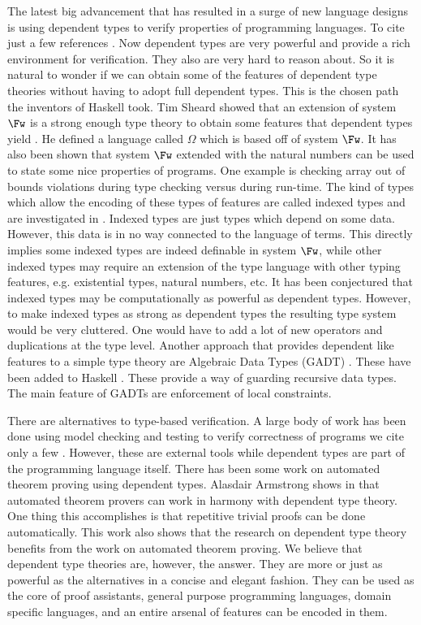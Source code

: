 The latest big advancement that has resulted in a surge of new
language designs is using dependent types to verify properties of
programming languages.  To cite just a few references
\cite{Vytiniotis:2007,Brady:2011,Mcbride:2004,Altenkirch:2003,Norell:2007,Stump:2009,Licata:2005}.
Now dependent types are very powerful and provide a rich environment
for verification.  They also are very hard to reason about.  So it is
natural to wonder if we can obtain some of the features of dependent
type theories without having to adopt full dependent types.  This is
the chosen path the inventors of Haskell took.  Tim Sheard showed that
an extension of system $\Fw$ is a strong enough type theory to obtain
some features that dependent types yield \cite{Sheard:2006}.  He
defined a language called $\Omega$ which is based off of system $\Fw$.
It has also been shown that system $\Fw$ extended with the natural
numbers can be used to state some nice properties of programs.  One
example is checking array out of bounds violations during type
checking versus during run-time.  The kind of types which allow the
encoding of these types of features are called indexed types and are
investigated in \cite{Fogarty:2007,Zenger:1997}.  Indexed types are
just types which depend on some data.  However, this data is in no way
connected to the language of terms.  This directly implies some indexed
types are indeed definable in system $\Fw$, while other indexed types
may require an extension of the type language with other typing
features, e.g. existential types, natural numbers, etc.  It has been
conjectured that indexed types may be computationally as powerful as
dependent types.  However, to make indexed types as strong as
dependent types the resulting type system would be very cluttered.
One would have to add a lot of new operators and duplications at the
type level.  Another approach that provides dependent like features to
a simple type theory are Algebraic Data Types (GADT) \cite{Xi:2003}.
These have been added to Haskell \cite{Jones:2006}.  These provide a
way of guarding recursive data types.  The main feature of GADTs are
enforcement of local constraints.

There are alternatives to type-based verification.  A large
body of work has been done using model checking and testing to verify
correctness of programs we cite only a few
\cite{Andrews:2003,Aspinall:2007,Cousot:2007,Klein:2003,Yang:2006}.
However, these are external tools while dependent types are part of
the programming language itself. There has been some work on automated
theorem proving using dependent types.  Alasdair Armstrong shows in
\cite{Armstrong:2011} that automated theorem provers can work in
harmony with dependent type theory.  One thing this accomplishes is
that repetitive trivial proofs can be done automatically.  This work
also shows that the research on dependent type theory benefits from
the work on automated theorem proving.  We believe that dependent type
theories are, however, the answer.  They are more or just as powerful as
the alternatives in a concise and elegant fashion.  They can be used
as the core of proof assistants, general purpose programming
languages, domain specific languages, and an entire arsenal of
features can be encoded in them.

